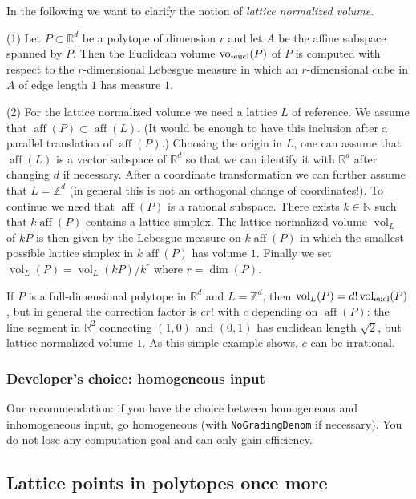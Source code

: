 \documentclass[12pt,a4paper]{scrartcl}
\theoremstyle{definition}
\def\ZZ{{\mathbb Z}}
\def\RR{{\mathbb R}}
\def\NN{{\mathbb N}}
\DeclareMathOperator{\aff}{aff}
\DeclareMathOperator{\vol}{vol}
\begin{document}
In the following we want to clarify the notion of \emph{lattice normalized volume}.

(1) Let $P\subset\RR^d$ be a polytope of dimension $r$ and let $A$ be the affine subspace spanned by $P$. Then the Euclidean volume $\vol_{\textup{eucl}}(P)$ of $P$ is computed with respect to the $r$-dimensional Lebesgue measure in which an $r$-dimensional cube in $A$ of edge length $1$ has measure $1$.

(2) For the lattice normalized volume we need a lattice $L$ of reference. We assume that $\aff(P)\subset\aff(L)$. (It would be enough to have this inclusion after a parallel translation of $\aff(P)$.) Choosing the origin in $L$, one can assume that $\aff(L)$ is a vector subspace of $\RR^d$ so that we can identify it with $\RR^d$ after changing $d$ if necessary. After a coordinate transformation we can further assume that $L=\ZZ^d$ (in general this is not an orthogonal change of coordinates!). To continue we need that $\aff(P)$ is a rational subspace. There exists $k\in\NN$ such that $k\aff(P)$ contains a lattice simplex. The lattice normalized volume $\vol_L$ of $kP$ is then given by the Lebesgue measure on $k\aff(P)$ in which the smallest possible lattice simplex in $k\aff(P)$ has volume $1$. Finally we set $\vol_L(P)=\vol_L(kP)/k^r$ where $r=\dim(P)$.

If $P$ is a full-dimensional polytope in $\RR^d$ and $L=\ZZ^d$, then $\vol_L(P)=d!\vol_{\textup{eucl}}(P)$, but in general the correction factor is $cr!$ with $c$ depending on $\aff(P)$: the line segment in $\RR^2$ connecting $(1,0)$ and $(0,1)$ has euclidean length $\sqrt{2}$, but lattice normalized volume $1$. As this simple example shows, $c$ can be irrational.

\subsubsection{Developer's choice: homogeneous input}

Our recommendation: if you have the choice between homogeneous and inhomogeneous input, go homogeneous (with \verb|NoGradingDenom| if necessary). You do not lose any computation goal and can only gain efficiency.

\subsection{Lattice points in polytopes once more}\label{LattPoints}
\end{document}
